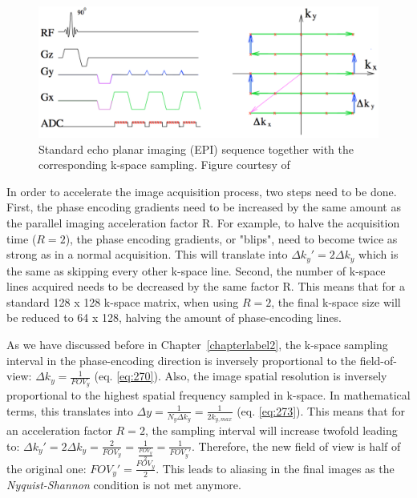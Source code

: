 \begin{figure}[H]
    \centering
    \includegraphics[width=1\textwidth,keepaspectratio]{episequence}
    \caption{Standard echo planar imaging (EPI) sequence together with the corresponding k-space sampling. Figure courtesy of \cite{Drobnjak07}}
    \label{fig:episequence}
\end{figure}

In order to accelerate the image acquisition process, two steps need to be done. First, the phase encoding gradients need to be increased by the same amount as the parallel imaging acceleration factor R. For example, to halve the acquisition time ($R = 2$), the phase encoding gradients, or "blips", need to become twice as strong as in a normal acquisition. This will translate into $\Delta k_y' = 2 \Delta k_y$ which is the same as skipping every other k-space line. Second, the number of k-space lines acquired needs to be decreased by the same factor R. This means that for a standard 128 x 128 k-space matrix, when using $R = 2$, the final k-space size will be reduced to 64 x 128, halving the amount of phase-encoding lines.

As we have discussed before in Chapter~\ref{chapterlabel2}, the 
k-space sampling interval in the phase-encoding direction is inversely proportional to the field-of-view: $\Delta k_y = \frac{1}{FOV_y}$ (eq. \ref{eq:270}). Also, the image spatial resolution is inversely proportional to the highest spatial frequency sampled in k-space. In mathematical terms, this translates into $\Delta y = \frac{1}{N_y \Delta k_y} = \frac{1}{2 k_{y,max}}$ (eq. \ref{eq:273}). This means that for an acceleration factor $R = 2$, the sampling interval will increase twofold leading to: $\Delta k_y' = 2 \Delta k_y = \frac{2}{FOV_y} = \frac{1}{\frac{FOV_y}{2}} = \frac{1}{FOV_y'}$. Therefore, the new field of view is half of the original one: $FOV_y' = \frac{FOV_y}{2}$. This leads to aliasing in the final images as the \textit{Nyquist-Shannon} condition is not met anymore.

